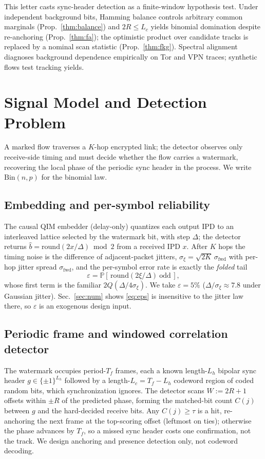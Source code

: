 \documentclass[journal]{IEEEtran}
\newcommand{\sxi}{\sigma_\xi}
\newcommand{\sfwd}{\sigma_{\mathrm{fwd}}}
\newcommand{\Tf}{T_f}
\newcommand{\pbit}{\varepsilon}
\newcommand{\Lh}{L_h}
\newcommand{\Prob}{\mathbb{P}}
\newcommand{\Bin}{\mathrm{Bin}}
\begin{document}
This letter casts sync-header detection as a finite-window hypothesis test. Under independent background bits, Hamming balance controls arbitrary common marginals (Prop.~\ref{thm:balance}) and $2R\le L_c$ yields binomial domination despite re-anchoring (Prop.~\ref{thm:fa}); the optimistic product over candidate tracks is replaced by a nominal scan statistic (Prop.~\ref{thm:fkg}). Spectral alignment diagnoses background dependence empirically on Tor and VPN traces; synthetic flows test tracking yields.

\section{Signal Model and Detection Problem}
\label{sec:model}
A marked flow traverses a $K$-hop encrypted link; the detector observes only receive-side timing and must decide whether the flow carries a watermark, recovering the local phase of the periodic sync header in the process. We write $\Bin(n,p)$ for the binomial law.

\subsection{Embedding and per-symbol reliability}
The causal QIM embedder (delay-only) quantizes each output IPD to an interleaved lattice selected by the watermark bit, with step $\Delta$; the detector returns $\hat b=\mathrm{round}(2x/\Delta)\bmod 2$ from a received IPD $x$. After $K$ hops the timing noise is the difference of adjacent-packet jitters, $\sxi=\sqrt{2K}\,\sfwd$ with per-hop jitter spread $\sfwd$, and the per-symbol error rate is exactly the \emph{folded} tail
\begin{equation}
\pbit=\Prob[\,\mathrm{round}(2\xi/\Delta)\ \text{odd}\,],
\label{eq:eps}
\end{equation}
whose first term is the familiar $2Q(\Delta/4\sxi)$. We take $\pbit=5\%$ ($\Delta/\sxi\approx7.8$ under Gaussian jitter). Sec.~\ref{sec:num} shows \eqref{eq:eps} is insensitive to the jitter law there, so $\pbit$ is an exogenous design input.

\subsection{Periodic frame and windowed correlation detector}
The watermark occupies period-$\Tf$ frames, each a known length-$\Lh$ bipolar sync header $g\in\{\pm1\}^{\Lh}$ followed by a length-$L_c=\Tf-\Lh$ codeword region of coded random bits, which synchronization ignores. The detector scans $W:=2R+1$ offsets within $\pm R$ of the predicted phase, forming the matched-bit count $C(j)$ between $g$ and the hard-decided receive bits. Any $C(j)\ge\tau$ is a hit, re-anchoring the next frame at the top-scoring offset (leftmost on ties); otherwise the phase advances by $\Tf$, so a missed sync header costs one confirmation, not the track. We design anchoring and presence detection only, not codeword decoding.
\end{document}
